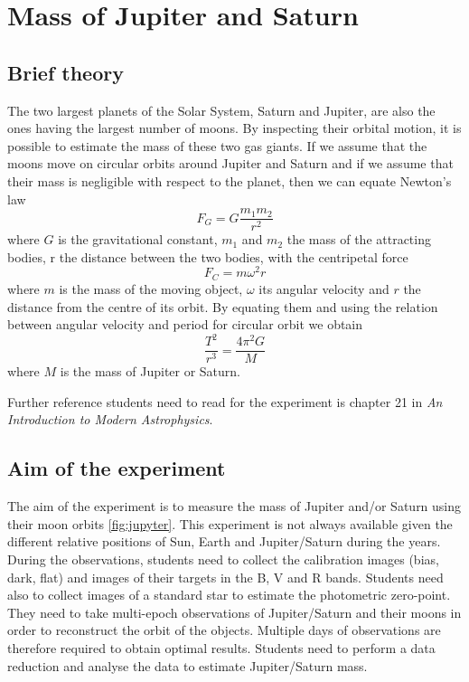 \documentclass[a4paper, 11pt, fleqn]{memoir}
\begin{document}
\section{Mass of Jupiter and Saturn}

\subsection{Brief theory}

The two largest planets of the Solar System, Saturn and Jupiter, are also the ones having the largest number of moons.
By inspecting their orbital motion, it is possible to estimate the mass of these two gas giants.
If we assume that the moons move on circular orbits around Jupiter and Saturn and if we assume that their mass is negligible with respect to the planet, then we can equate Newton's law
\begin{equation}
    F_G = G \frac{m_1 m_2}{r^2}
\end{equation}
where $G$ is the gravitational constant,
$m_1$ and $m_2$ the mass of the attracting bodies,
r the distance between the two bodies, with the centripetal force
\begin{equation}
    F_C = m \omega^2 r
\end{equation}
where
$m$ is the mass of the moving object,
$\omega$ its angular velocity and
$r$ the distance from the centre of its orbit.
By equating them and using the relation between angular velocity and period for circular orbit we obtain
\begin{equation}
    \frac{T^2}{r^3} = \frac{4 \pi^2 G}{M}
\end{equation}
where $M$ is the mass of Jupiter or Saturn.

Further reference students need to read for the experiment is chapter 21 in \emph{An Introduction to Modern Astrophysics}\autocite{carroll2017introduction}.

\subsection{Aim of the experiment}

The aim of the experiment is to measure the mass of Jupiter and/or Saturn using their moon orbits \ref{fig:jupyter}.
This experiment is not always available given the different relative positions of Sun, Earth and Jupiter/Saturn during the years.
During the observations, students need to collect the calibration images (bias, dark, flat) and images of their targets in the B, V and R bands.
Students need also to collect images of a standard star to estimate the photometric zero-point.
They need to take multi-epoch observations of Jupiter/Saturn and their moons in order to reconstruct the orbit of the objects.
Multiple days of observations are therefore required to obtain optimal results.
Students need to perform a data reduction and analyse the data to estimate Jupiter/Saturn mass.
\end{document}
